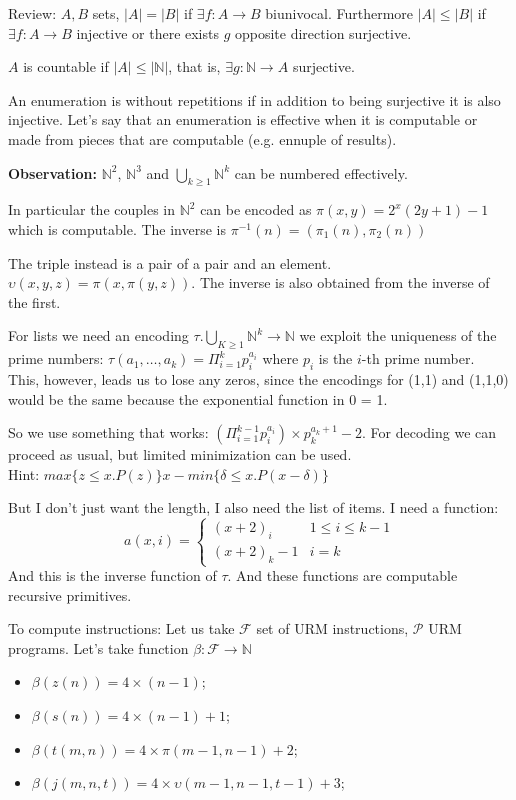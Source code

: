 \documentclass{amsbook}
\newcommand{\nat}{\ensuremath{\mathbb{N}}}
\theoremstyle{definition}
\theoremstyle{remark}
\numberwithin{section}{chapter}
\numberwithin{equation}{chapter}
\begin{document}
Review: $ A, B $ sets, $ |A| = |B| $ if $ \exists f:A\rightarrow B $ biunivocal. Furthermore $ |A| \leq |B| $ if $ \exists f:A\rightarrow B $ injective or there exists $g$ opposite direction surjective.

$A$ is countable if $ |A| \leq |\nat| $, that is, $ \exists g: \nat \rightarrow A $ surjective.

An enumeration is without repetitions if in addition to being surjective it is also injective. Let's say that an enumeration is effective when it is computable or made from pieces that are computable (e.g. ennuple of results).

\textbf{Observation:} $ \nat^2 $, $ \nat^3 $ and $ \bigcup_{k\geq 1} \nat^k $ can be numbered effectively.

In particular the couples in $ \nat^2 $ can be encoded as $ \pi(x,y) = 2^x(2y+1)-1 $ which is computable. The inverse is $ \pi^{-1}(n) = (\pi_1(n), \pi_2(n)) $

The triple instead is a pair of a pair and an element. $ \upsilon (x,y,z) = \pi (x, \pi(y,z))$. The inverse is also obtained from the inverse of the first.

For lists we need an encoding $ \tau . \bigcup_{K \geq 1} \nat^k \rightarrow \nat $ we exploit the uniqueness of the prime numbers: $ \tau(a_1,\dots,a_k) = \Pi_{i=1}^k p_i^{a_i}$ where $ p_i $ is the $i$-th prime number.\\This, however, leads us to lose any zeros, since the encodings for (1,1) and (1,1,0) would be the same because the exponential function in 0 = 1.

So we use something that works: $ (\Pi_{i=1}^{k-1} p_i^{a_i}) \times p_k^{a_k+1} - 2$. For decoding we can proceed as usual, but limited minimization can be used.\\ Hint: $ max \{z \leq x . P(z)\} x - min\{\delta \leq x . P(x-\delta)\}$

But I don't just want the length, I also need the list of items. I need a function: \begin{equation*}
	a(x,i) = \begin{cases}
		(x+2)_i   & 1 \leq i \leq k-1 \\
		(x+2)_k-1 & i = k
	\end{cases}
\end{equation*}
And this is the inverse function of $\tau$. And these functions are computable recursive primitives.

To compute instructions: Let us take $ \mathcal{F} $ set of URM instructions, $ \mathcal{P} $ URM programs. Let's take function $ \beta:\mathcal{F}\rightarrow\nat $
\begin{itemize}
	\item $ \beta(z(n)) = 4 \times (n-1) $;
	\item $ \beta(s(n)) = 4 \times (n-1)+1 $;
	\item $ \beta(t(m,n)) = 4 \times \pi(m-1,n-1)+2 $;
	\item $ \beta(j(m,n,t)) = 4 \times \upsilon(m-1,n-1,t-1)+3 $;
\end{itemize}
\end{document}
